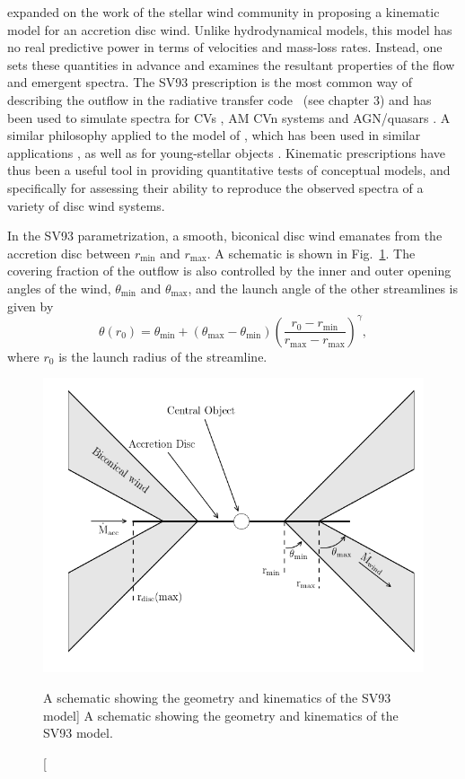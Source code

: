 \citet[][hereafter SV93]{SV93} 
expanded on the work of the stellar wind community \citep[e.g.][]{AL85} 
in proposing a kinematic model for an accretion disc wind. Unlike 
hydrodynamical models, this model has no real predictive power in terms of velocities
and mass-loss rates. Instead, one sets these quantities in advance and examines the 
resultant properties of the flow and emergent spectra. The SV93 prescription
is the most common way of describing the outflow in the 
radiative transfer code \py\ (see chapter 3)
and has been used to simulate spectra for CVs \citep[][chapter 4]{LK02, M15}, 
AM CVn systems \citep{kusterer2014} and AGN/quasars 
\citep[][chapter 5]{higginbottom2013, M16, yong2016}. 
A similar philosophy applied to the model of \cite{KWD95}, which has been used
in similar applications \citep{LK02, simlong2008, sim2010}, as 
well as for young-stellar objects \citep[YSOs;][]{simmacro2005}.
Kinematic prescriptions have thus been a useful tool in providing quantitative
tests of conceptual models, and specifically for assessing their ability to reproduce
the observed spectra of a variety of disc wind systems.

In the SV93 parametrization,
a smooth, biconical disc wind emanates from the accretion disc between 
$r_{\mathrm{\mathrm{min}}}$ and $r_{\mathrm{\mathrm{max}}}$. A schematic is shown in Fig.~\ref{fig:sv93}.
The covering fraction of the outflow is 
also controlled by the inner and outer opening angles of the wind, $\theta_{\mathrm{min}}$ and
$\theta_{\mathrm{max}}$, and the launch angle of the other streamlines is given by 
\begin{equation}
\theta(r_0) = \theta_{\mathrm{min}} + (\theta_{\mathrm{max}} - \theta_{\mathrm{min}}) \left(\frac{r_0 - r_{\mathrm{min}}}{r_{\mathrm{max}} - r_{\mathrm{max}}} \right)^{\gamma},
\label{eq:wind_theta}
\end{equation}
where $r_0$ is the launch radius of the streamline.

\begin{figure}
\centering
\includegraphics[width=1.0\textwidth]{figures/02-outflows/cartoon_general.png}
\caption
[A schematic showing the geometry and kinematics of the SV93 model]
{
A schematic showing the geometry and kinematics of the SV93 model. 
} 
\label{fig:sv93}
\end{figure}


